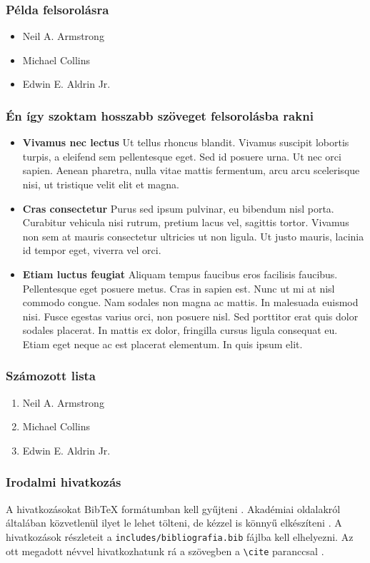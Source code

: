 \subsubsection*{Példa felsorolásra}
\begin{itemize}
	\item Neil A. Armstrong
	\item Michael Collins
	\item Edwin E. Aldrin Jr.
\end{itemize}

\subsubsection*{Én így szoktam hosszabb szöveget felsorolásba rakni}
\begin{itemize}
	\item \textbf{Vivamus nec lectus} Ut tellus rhoncus blandit. Vivamus suscipit lobortis turpis, a eleifend sem pellentesque eget. Sed id posuere urna. Ut nec orci sapien. Aenean pharetra, nulla vitae mattis fermentum, arcu arcu scelerisque nisi, ut tristique velit elit et magna.
	\item \textbf{Cras consectetur} Purus sed ipsum pulvinar, eu bibendum nisl porta. Curabitur vehicula nisi rutrum, pretium lacus vel, sagittis tortor. Vivamus non sem at mauris consectetur ultricies ut non ligula. Ut justo mauris, lacinia id tempor eget, viverra vel orci.
	\item \textbf{Etiam luctus feugiat} Aliquam tempus faucibus eros facilisis faucibus. Pellentesque eget posuere metus. Cras in sapien est. Nunc ut mi at nisl commodo congue. Nam sodales non magna ac mattis. In malesuada euismod nisi. Fusce egestas varius orci, non posuere nisl. Sed porttitor erat quis dolor sodales placerat. In mattis ex dolor, fringilla cursus ligula consequat eu. Etiam eget neque ac est placerat elementum. In quis ipsum elit. 
\end{itemize}

\subsubsection*{Számozott lista}
\begin{enumerate}
	\item Neil A. Armstrong
	\item Michael Collins
	\item Edwin E. Aldrin Jr.
\end{enumerate} 

\subsubsection*{Irodalmi hivatkozás}
A hivatkozásokat BibTeX formátumban kell gyűjteni \cite{Lee1987}. Akadémiai oldalakról általában közvetlenül ilyet le lehet tölteni, de kézzel is könnyű elkészíteni \cite{Nasa}. A hivatkozások részleteit a \verb|includes/bibliografia.bib| fájlba kell elhelyezni. Az ott megadott névvel hivatkozhatunk rá a szövegben a \verb|\cite| paranccsal \cite{Jeney2014}.


